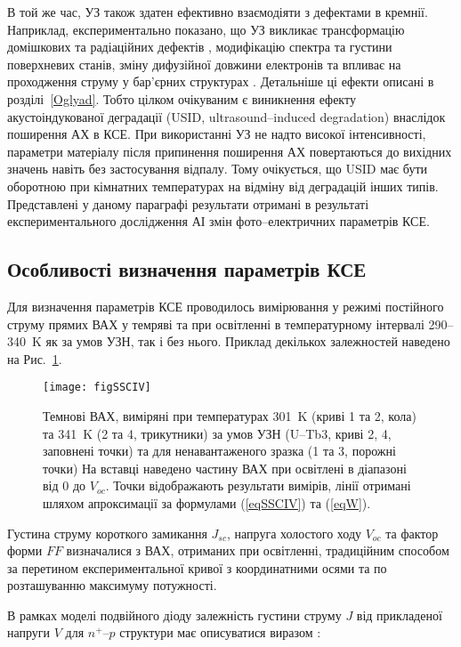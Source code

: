 В той же час, УЗ також здатен ефективно взаємодіяти з дефектами в кремнії.
Наприклад,  експериментально показано, що УЗ викликає трансформацію домішкових та радіаційних дефектів \cite{Korotchenkov1995,Ostapenko1995,UST:Medvid,YOlikh:SupMicr},
модифікацію спектра \cite{Zaver:2008} та густини \cite{Mirsagatov} поверхневих станів,
зміну дифузійної довжини електронів \cite{Ostapenko1999,Ostrovskii2001}
та впливає на проходження струму у бар'єрних структурах \cite{Davletova2009,Davletova2008,YOlikh2005}.
Детальніше ці ефекти описані в розділі~\ref{Oglyad}.
Тобто цілком очікуваним є виникнення ефекту акустоіндукованої деградації (USID, ultrasound--induced degradation) внаслідок поширення АХ в КСЕ.
При використанні УЗ не надто високої інтенсивності, параметри матеріалу після припинення поширення АХ повертаються до вихідних значень \cite{Ostapenko1999,Ostrovskii2001,Korotchenkov1995} навіть без застосування відпалу.
Тому очікується, що USID має бути оборотною при кімнатних температурах на відміну від деградацій інших типів.
Представлені у даному параграфі результати отримані в результаті експериментального дослідження АІ змін фото--електричних параметрів КСЕ.

\subsection{Особливості визначення параметрів КСЕ\label{sbSSCMethod}}
Для визначення параметрів КСЕ проводилось вимірювання у режимі постійного струму прямих ВАХ у темряві та при освітленні
в температурному інтервалі  290--340~K як за умов УЗН, так і без нього.
Приклад декількох залежностей наведено на Рис.~\ref{figSSCIV}.
\begin{figure}
\center
\texttt{[image: figSSCIV]}%
\caption{\label{figSSCIV}
Темнові ВАХ, виміряні при температурах 301~K (криві 1 та 2, кола) та 341~K (2 та 4, трикутники)
за умов УЗН (U--Tb3, криві 2, 4, заповнені точки) та для ненавантаженого зразка (1 та 3, порожні точки)
На вставці наведено частину ВАХ при освітлені в діапазоні від 0 до $V_{oc}$.
Точки відображають результати вимірів, лінії отримані шляхом апроксимації за формулами (\ref{eqSSCIV}) та (\ref{eqW}).
}%
\end{figure}
Густина струму короткого замикання $J_{sc}$, напруга холостого ходу $V_{oc}$ та фактор форми $F\!F$ визначалися з ВАХ, отриманих при освітленні,
традиційним способом за перетином експериментальної кривої з координатними осями  та по розташуванню максимуму потужності.

В рамках моделі подвійного діоду залежність густини струму $J$ від прикладеної напруги $V$ для  $n^+$--$p$ структури має описуватися
 виразом \cite{2Diod:Ishaque,2Diod:Buhler}:

